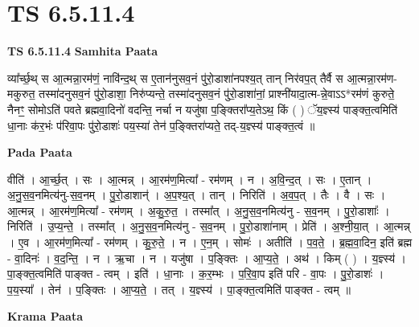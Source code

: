 \documentclass[17pt]{extarticle}
\begin{document}
\section{ TS 6.5.11.4 }

\textbf{TS 6.5.11.4 } \newline
\textbf{Samhita Paata} \newline

व्या᳚र्च्छ॒थ् स आ॒त्मन्ना॒रम॑णं॒ नावि॑न्द॒थ् स ए॒तान॑नुसव॒नं पु॑रो॒डाशा॑नपश्य॒त् तान् निर॑वप॒त् तैर्वै स आ॒त्मन्ना॒रम॑ण-मकुरुत॒ तस्मा॑दनुसव॒नं पु॑रो॒डाशा॒ निरु॑प्यन्ते॒ तस्मा॑दनुसव॒नं पु॑रो॒डाशा॑नां॒ प्राश्नी॑यादा॒त्म-न्ने॒वाऽऽ*रम॑णं कुरुते॒ नैनꣳ॒॒ सोमोऽति॑ पवते ब्रह्मवा॒दिनो॑ वदन्ति॒ नर्चा न यजु॑षा प॒ङ्क्तिरा᳚प्य॒तेऽथ॒ किं ( ) ॅय॒ज्ञ्स्य॑ पाङ्क्त॒त्वमिति॑ धा॒नाः क॑र॒भंः प॑रिवा॒पः पु॑रो॒डाशः॑ पय॒स्या॑ तेन॑ प॒ङ्क्तिरा॑प्यते॒ तद्-य॒ज्ञ्स्य॑ पाङ्क्त॒त्वं ॥ \newline

\textbf{Pada Paata} \newline

वीति॑ । आ॒र्च्छ॒त् । सः । आ॒त्मन्न् । आ॒रम॑ण॒मित्या᳚ - रम॑णम् । न । अ॒वि॒न्द॒त् । सः । ए॒तान् । अ॒नु॒स॒व॒नमित्य॑नु-स॒व॒नम् । पु॒रो॒डाशान्॑ । अ॒प॒श्य॒त् । तान् । निरिति॑ । अ॒व॒प॒त् । तैः । वै । सः । आ॒त्मन्न् । आ॒रम॑ण॒मित्या᳚ - रम॑णम् । अ॒कु॒रु॒त॒ । तस्मा᳚त् । अ॒नु॒स॒व॒नमित्य॑नु - स॒व॒नम् । पु॒रो॒डाशाः᳚ । निरिति॑ । उ॒प्य॒न्ते॒ । तस्मा᳚त् । अ॒नु॒स॒व॒नमित्य॑नु - स॒व॒नम् । पु॒रो॒डाशा॑नाम् । प्रेति॑ । अ॒श्नी॒या॒त् । आ॒त्मन्न् । ए॒व । आ॒रम॑ण॒मित्या᳚ - रम॑णम् । कु॒रु॒ते॒ । न । ए॒न॒म् । सोमः॑ । अतीति॑ । प॒व॒ते॒ । ब्र॒ह्म॒वा॒दिन॒ इति॑ ब्रह्म - वा॒दिनः॑ । व॒द॒न्ति॒ । न । ऋ॒चा । न । यजु॑षा । प॒ङ्क्तिः । आ॒प्य॒ते॒ । अथ॑ । किम् ( ) । य॒ज्ञ्स्य॑ । पा॒ङ्क्त॒त्वमिति॑ पाङ्क्त - त्वम् । इति॑ । धा॒नाः । क॒र॒म्भः । प॒रि॒वा॒प इति॑ परि - वा॒पः । पु॒रो॒डाशः॑ । प॒य॒स्या᳚ । तेन॑ । प॒ङ्क्तिः । आ॒प्य॒ते॒ । तत् । य॒ज्ञ्स्य॑ । पा॒ङ्क्त॒त्वमिति॑ पाङ्क्त - त्वम् ॥  \newline


\textbf{Krama Paata} \newline
\end{document}
